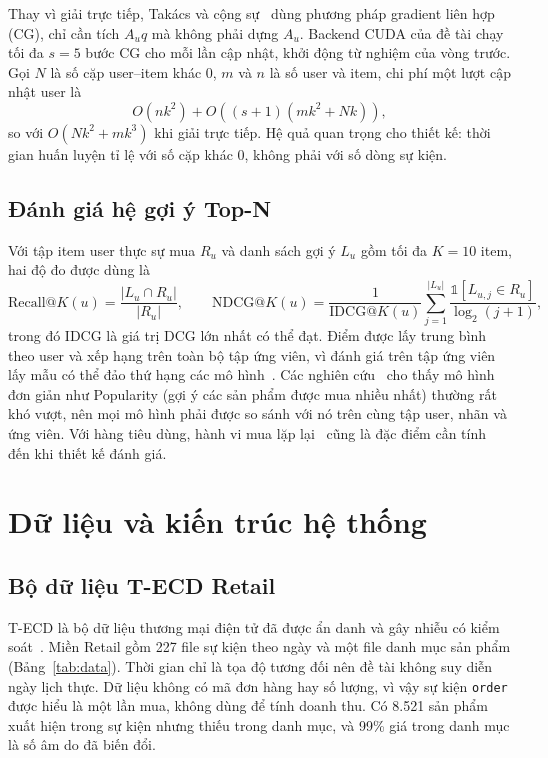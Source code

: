 \documentclass[a4paper,12pt,oneside]{report}
\begin{document}
Thay vì giải trực tiếp, Takács và cộng sự~\cite{takacs} dùng phương pháp gradient liên hợp (CG), chỉ cần tích $A_uq$ mà không phải dựng $A_u$. Backend CUDA của đề tài chạy tối đa $s=5$ bước CG cho mỗi lần cập nhật, khởi động từ nghiệm của vòng trước. Gọi $N$ là số cặp user–item khác 0, $m$ và $n$ là số user và item, chi phí một lượt cập nhật user là
\begin{equation}
O\!\left(nk^2\right)+O\!\left((s+1)(mk^2+Nk)\right),
\end{equation}
so với $O(Nk^2+mk^3)$ khi giải trực tiếp. Hệ quả quan trọng cho thiết kế: thời gian huấn luyện tỉ lệ với số cặp khác 0, không phải với số dòng sự kiện.

\section{Đánh giá hệ gợi ý Top-N}
Với tập item user thực sự mua $R_u$ và danh sách gợi ý $L_u$ gồm tối đa $K=10$ item, hai độ đo được dùng là~\cite{rankingmetrics,ndcg}
\begin{equation}
\mathrm{Recall@}K(u)=\frac{|L_u\cap R_u|}{|R_u|},\qquad
\mathrm{NDCG@}K(u)=\frac{1}{\mathrm{IDCG@}K(u)}\sum_{j=1}^{|L_u|}\frac{\mathds{1}[L_{u,j}\in R_u]}{\log_2(j+1)},
\end{equation}
trong đó IDCG là giá trị DCG lớn nhất có thể đạt. Điểm được lấy trung bình theo user và xếp hạng trên toàn bộ tập ứng viên, vì đánh giá trên tập ứng viên lấy mẫu có thể đảo thứ hạng các mô hình~\cite{krichene}. Các nghiên cứu~\cite{cremonesi,dacrema} cho thấy mô hình đơn giản như Popularity (gợi ý các sản phẩm được mua nhiều nhất) thường rất khó vượt, nên mọi mô hình phải được so sánh với nó trên cùng tập user, nhãn và ứng viên. Với hàng tiêu dùng, hành vi mua lặp lại~\cite{repeat} cũng là đặc điểm cần tính đến khi thiết kế đánh giá.

\chapter{Dữ liệu và kiến trúc hệ thống}

\section{Bộ dữ liệu T-ECD Retail}
T-ECD là bộ dữ liệu thương mại điện tử đã được ẩn danh và gây nhiễu có kiểm soát~\cite{tecd}. Miền Retail gồm 227 file sự kiện theo ngày và một file danh mục sản phẩm (Bảng~\ref{tab:data}). Thời gian chỉ là tọa độ tương đối nên đề tài không suy diễn ngày lịch thực. Dữ liệu không có mã đơn hàng hay số lượng, vì vậy sự kiện \texttt{order} được hiểu là một lần mua, không dùng để tính doanh thu. Có 8.521 sản phẩm xuất hiện trong sự kiện nhưng thiếu trong danh mục, và 99\% giá trong danh mục là số âm do đã biến đổi.
\end{document}
